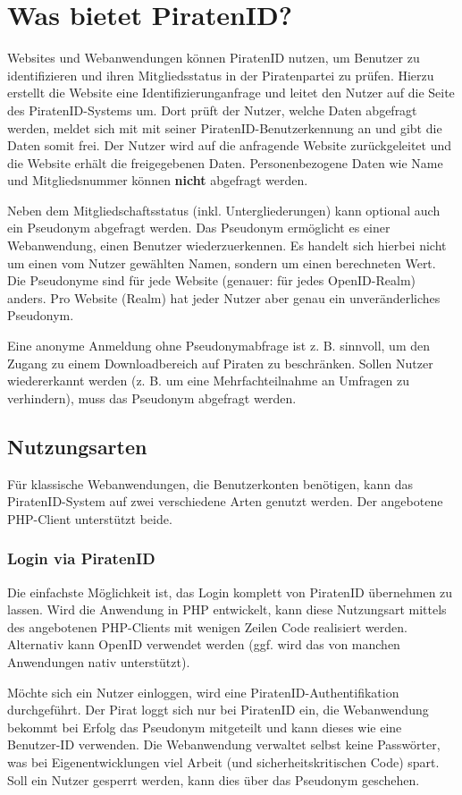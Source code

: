 \section{Was bietet PiratenID?}
Websites und Webanwendungen können PiratenID nutzen, um Benutzer zu identifizieren und ihren Mitgliedsstatus in der Piratenpartei zu prüfen.
Hierzu erstellt die Website eine Identifizierunganfrage und leitet den Nutzer auf die Seite des PiratenID-Systems um.
Dort prüft der Nutzer, welche Daten abgefragt werden, meldet sich mit mit seiner PiratenID-Benutzerkennung an und gibt die Daten somit frei.
Der Nutzer wird auf die anfragende Website zurückgeleitet und die Website erhält die freigegebenen Daten.
Personenbezogene Daten wie Name und Mitgliedsnummer können \textbf{nicht} abgefragt werden.

Neben dem Mitgliedschaftsstatus (inkl. Untergliederungen) kann optional auch ein Pseudonym abgefragt werden.
Das Pseudonym ermöglicht es einer Webanwendung, einen Benutzer wiederzuerkennen.
Es handelt sich hierbei nicht um einen vom Nutzer gewählten Namen, sondern um einen berechneten Wert.
Die Pseudonyme sind für jede Website (genauer: für jedes OpenID-Realm) anders.
Pro Website (Realm) hat jeder Nutzer aber genau ein unveränderliches Pseudonym.

Eine anonyme Anmeldung ohne Pseudonymabfrage ist z. B. sinnvoll, um den Zugang zu einem Downloadbereich auf Piraten zu beschränken.
Sollen Nutzer wiedererkannt werden (z. B. um eine Mehrfachteilnahme an Umfragen zu verhindern), muss das Pseudonym abgefragt werden.

\subsection{Nutzungsarten}
Für klassische Webanwendungen, die Benutzerkonten benötigen, kann das PiratenID-System auf zwei verschiedene Arten genutzt werden.
Der angebotene PHP-Client unterstützt beide.

\subsubsection{Login via PiratenID}
Die einfachste Möglichkeit ist, das Login komplett von PiratenID übernehmen zu lassen.
Wird die Anwendung in PHP entwickelt, kann diese Nutzungsart mittels des angebotenen PHP-Clients mit wenigen Zeilen Code realisiert werden.
Alternativ kann OpenID verwendet werden (ggf. wird das von manchen Anwendungen nativ unterstützt).

Möchte sich ein Nutzer einloggen, wird eine PiratenID-Authentifikation durchgeführt.
Der Pirat loggt sich nur bei PiratenID ein, die Webanwendung bekommt bei Erfolg das Pseudonym mitgeteilt und kann dieses wie eine Benutzer-ID verwenden.
Die Webanwendung verwaltet selbst keine Passwörter, was bei Eigenentwicklungen viel Arbeit (und sicherheitskritischen Code) spart.
Soll ein Nutzer gesperrt werden, kann dies über das Pseudonym geschehen.

